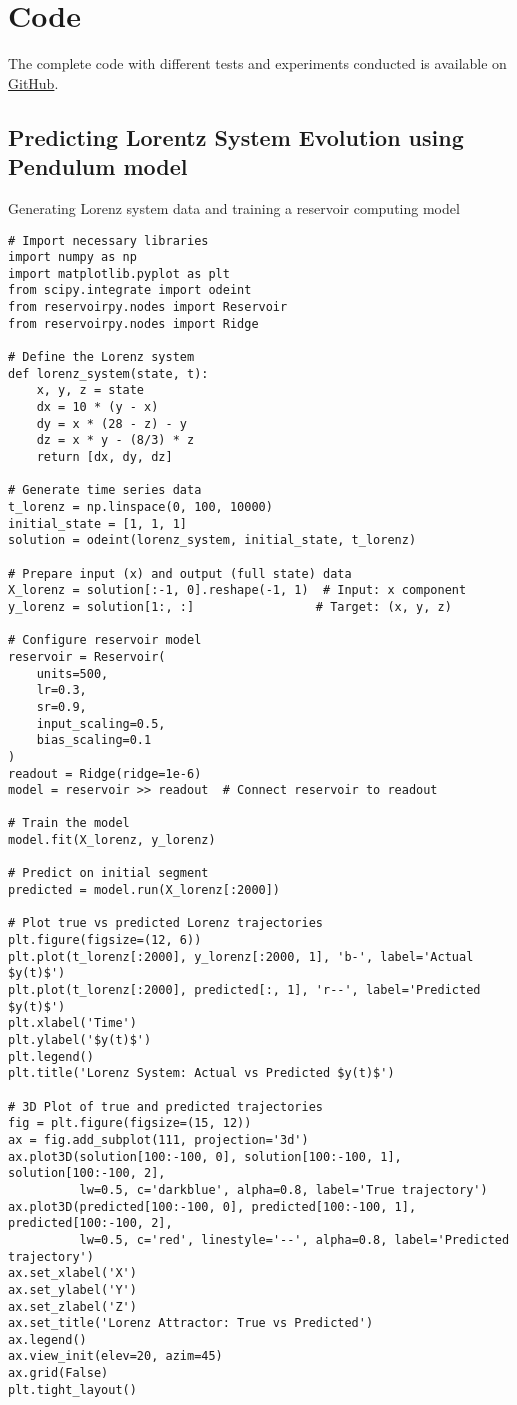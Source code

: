 \clearpage
\appendix
\section{Code}

The complete code with different tests and experiments conducted is available on \href{https://github.com/vimarsh244/ResorvoirComputing_SOP}{GitHub}.

\subsection*{Predicting Lorentz System Evolution using Pendulum model}
\label{code_lorenz_pendulum}
Generating Lorenz system data and training a reservoir computing model
\begin{verbatim}
# Import necessary libraries
import numpy as np
import matplotlib.pyplot as plt
from scipy.integrate import odeint
from reservoirpy.nodes import Reservoir
from reservoirpy.nodes import Ridge

# Define the Lorenz system
def lorenz_system(state, t):
    x, y, z = state
    dx = 10 * (y - x)
    dy = x * (28 - z) - y
    dz = x * y - (8/3) * z
    return [dx, dy, dz]

# Generate time series data
t_lorenz = np.linspace(0, 100, 10000)
initial_state = [1, 1, 1]
solution = odeint(lorenz_system, initial_state, t_lorenz)

# Prepare input (x) and output (full state) data
X_lorenz = solution[:-1, 0].reshape(-1, 1)  # Input: x component
y_lorenz = solution[1:, :]                 # Target: (x, y, z)

# Configure reservoir model
reservoir = Reservoir(
    units=500,
    lr=0.3,
    sr=0.9,
    input_scaling=0.5,
    bias_scaling=0.1
)
readout = Ridge(ridge=1e-6)
model = reservoir >> readout  # Connect reservoir to readout

# Train the model
model.fit(X_lorenz, y_lorenz)

# Predict on initial segment
predicted = model.run(X_lorenz[:2000])

# Plot true vs predicted Lorenz trajectories
plt.figure(figsize=(12, 6))
plt.plot(t_lorenz[:2000], y_lorenz[:2000, 1], 'b-', label='Actual $y(t)$')
plt.plot(t_lorenz[:2000], predicted[:, 1], 'r--', label='Predicted $y(t)$')
plt.xlabel('Time')
plt.ylabel('$y(t)$')
plt.legend()
plt.title('Lorenz System: Actual vs Predicted $y(t)$')

# 3D Plot of true and predicted trajectories
fig = plt.figure(figsize=(15, 12))
ax = fig.add_subplot(111, projection='3d')
ax.plot3D(solution[100:-100, 0], solution[100:-100, 1], solution[100:-100, 2],
          lw=0.5, c='darkblue', alpha=0.8, label='True trajectory')
ax.plot3D(predicted[100:-100, 0], predicted[100:-100, 1], predicted[100:-100, 2],
          lw=0.5, c='red', linestyle='--', alpha=0.8, label='Predicted trajectory')
ax.set_xlabel('X')
ax.set_ylabel('Y')
ax.set_zlabel('Z')
ax.set_title('Lorenz Attractor: True vs Predicted')
ax.legend()
ax.view_init(elev=20, azim=45)
ax.grid(False)
plt.tight_layout()
\end{verbatim}


